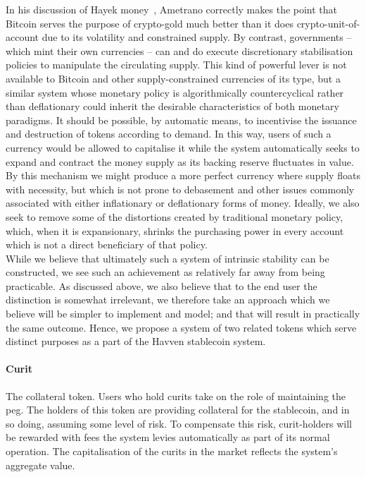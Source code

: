 \noindent  In his discussion of Hayek money~\cite{ametrano2016hayek}, Ametrano correctly makes the point that
Bitcoin serves the purpose of crypto-gold much better than it does crypto-unit-of-account due to its volatility
and constrained supply. By contrast, governments -- which mint their own currencies -- can and do execute
discretionary stabilisation policies to manipulate the circulating supply. This kind of powerful lever is not
available to Bitcoin and other supply-constrained currencies of its type, but a similar system whose monetary
policy is algorithmically countercyclical rather than deflationary could inherit the desirable characteristics
of both monetary paradigms. It should be possible, by automatic means, to incentivise the issuance and
destruction of tokens according to demand. In this way, users of such a currency would be allowed to
capitalise it while the system automatically seeks to expand and contract the money supply as its backing
reserve fluctuates in value. By this mechanism we might produce a more perfect currency where supply floats
with necessity, but which is not prone to debasement and other issues commonly associated with either
inflationary or deflationary forms of money. Ideally, we also seek to remove some of the distortions created
by traditional monetary policy, which, when it is expansionary, shrinks the purchasing power in every account
which is not a direct beneficiary of that policy.\\

\noindent While we believe that ultimately such a system of intrinsic stability can be constructed, we see such
an achievement as relatively far away from being practicable. As discussed above, we also believe that to the
end user the distinction is somewhat irrelevant, we therefore take an approach which we believe will be simpler
to implement and model; and that will result in practically the same outcome. Hence, we propose a system of two
related tokens which serve distinct purposes as a part of the Havven stablecoin system.

\paragraph{Curit} The collateral token. Users who hold curits take on the role of maintaining the peg. 
The holders of this token are providing collateral for the stablecoin, and in so doing, assuming some level of
risk. To compensate this risk, curit-holders will be rewarded with fees the system levies automatically as part
of its normal operation. The capitalisation of the curits in the market reflects the system's aggregate value.

